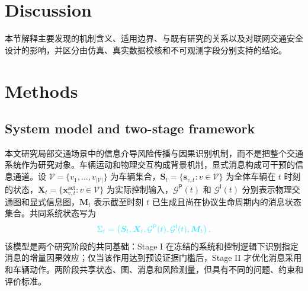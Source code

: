 \documentclass[10pt,a4paper,twocolumn]{article}
\newcommand{\revGreen}[1]{#1}
\newcommand{\revYellow}[1]{#1}
\newcommand{\revBlue}[1]{#1}
\newcommand{\revRed}[1]{#1}
\begin{document}
\section*{Discussion}
本节解释主要发现的机制含义、适用边界、与既有研究的关系以及对联网交通安全设计的影响，并区分由仿真、真实数据校核和不可观测字段分别支持的结论。

\renewcommand{\revGreen}[1]{\textcolor{advisorGreen}{#1}}
\renewcommand{\revYellow}[1]{\textcolor{advisorYellow!75!black}{#1}}
\renewcommand{\revBlue}[1]{\textcolor{advisorBlue!70!black}{#1}}
\renewcommand{\revRed}[1]{\textcolor{advisorRed}{#1}}
\section*{Methods}
\subsection*{System model and two-stage framework}
\revBlue{本文研究局部交通场景中的信息介导风险传播与因果识别机制，而不是把整个交通系统作为研究对象。车辆运动和物理交互构成背景机制，显式消息构成可干预的信息通道。设 $\mathcal V=\{v_1,\ldots,v_{|\mathcal V|}\}$ 为车辆集合，$\bm S_t=\{\bm s_{v,t}:v\in\mathcal V\}$ 为全体车辆在 $t$ 时刻的状态，$\bm X_t=\{\bm x_{v,t}^{\mathsf{act}}:v\in\mathcal V\}$ 为实际控制输入，$\mathcal G^{\mathsf P}(t)$ 和 $\mathcal G^{\mathsf I}(t)$ 分别表示物理交通图和显式信息图，$\bm M_t$ 表示截至时刻 $t$ 已生成且尚在协议生命周期内的消息状态集合。共同系统状态写为}
\begin{equation}
\color{advisorBlue}
\Sigma_t=\left(\bm S_t,\bm X_t,\mathcal G^{\mathsf P}(t),\mathcal G^{\mathsf I}(t),\bm M_t\right),
\end{equation}
\revBlue{该模型是两个研究阶段的共同基础：Stage I 在冻结的系统和控制逻辑下识别指定消息的增量因果效应；仅当该作用达到预设证据门槛后，Stage II 才优化消息采用和车辆动作。两阶段共享状态、图、消息和风险测量，但具有不同的问题、约束和评价标准。}
\end{document}
